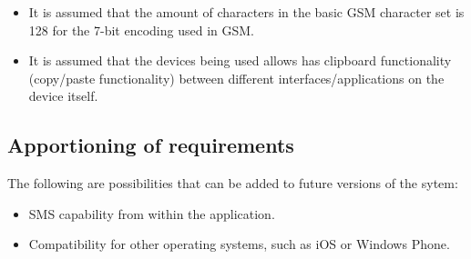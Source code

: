 \begin{itemize}
\item It is assumed that the amount of characters in the basic GSM character set is 128 for the 7-bit encoding used in GSM.
\item It is assumed that the devices being used allows has clipboard functionality (copy/paste functionality) between different interfaces/applications on the device itself.
\end{itemize}

\subsection{Apportioning of requirements}
The following are possibilities that can be added to future versions of the sytem:
\begin{itemize}
\item SMS capability from within the application.
\item Compatibility for other operating systems, such as iOS or Windows Phone.
\end{itemize}
